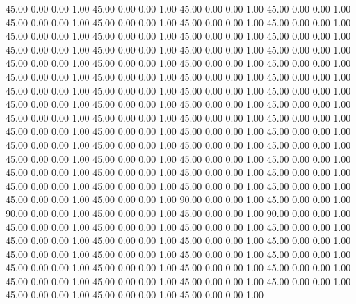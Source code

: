    45.00   0.00   0.00   1.00
   45.00   0.00   0.00   1.00
   45.00   0.00   0.00   1.00
   45.00   0.00   0.00   1.00
   45.00   0.00   0.00   1.00
   45.00   0.00   0.00   1.00
   45.00   0.00   0.00   1.00
   45.00   0.00   0.00   1.00
   45.00   0.00   0.00   1.00
   45.00   0.00   0.00   1.00
   45.00   0.00   0.00   1.00
   45.00   0.00   0.00   1.00
   45.00   0.00   0.00   1.00
   45.00   0.00   0.00   1.00
   45.00   0.00   0.00   1.00
   45.00   0.00   0.00   1.00
   45.00   0.00   0.00   1.00
   45.00   0.00   0.00   1.00
   45.00   0.00   0.00   1.00
   45.00   0.00   0.00   1.00
   45.00   0.00   0.00   1.00
   45.00   0.00   0.00   1.00
   45.00   0.00   0.00   1.00
   45.00   0.00   0.00   1.00
   45.00   0.00   0.00   1.00
   45.00   0.00   0.00   1.00
   45.00   0.00   0.00   1.00
   45.00   0.00   0.00   1.00
   45.00   0.00   0.00   1.00
   45.00   0.00   0.00   1.00
   45.00   0.00   0.00   1.00
   45.00   0.00   0.00   1.00
   45.00   0.00   0.00   1.00
   45.00   0.00   0.00   1.00
   45.00   0.00   0.00   1.00
   45.00   0.00   0.00   1.00
   45.00   0.00   0.00   1.00
   45.00   0.00   0.00   1.00
   45.00   0.00   0.00   1.00
   45.00   0.00   0.00   1.00
   45.00   0.00   0.00   1.00
   45.00   0.00   0.00   1.00
   45.00   0.00   0.00   1.00
   45.00   0.00   0.00   1.00
   45.00   0.00   0.00   1.00
   45.00   0.00   0.00   1.00
   45.00   0.00   0.00   1.00
   45.00   0.00   0.00   1.00
   45.00   0.00   0.00   1.00
   45.00   0.00   0.00   1.00
   45.00   0.00   0.00   1.00
   45.00   0.00   0.00   1.00
   45.00   0.00   0.00   1.00
   45.00   0.00   0.00   1.00
   45.00   0.00   0.00   1.00
   45.00   0.00   0.00   1.00
   45.00   0.00   0.00   1.00
   45.00   0.00   0.00   1.00
   90.00   0.00   0.00   1.00
   45.00   0.00   0.00   1.00
   90.00   0.00   0.00   1.00
   45.00   0.00   0.00   1.00
   45.00   0.00   0.00   1.00
   90.00   0.00   0.00   1.00
   45.00   0.00   0.00   1.00
   45.00   0.00   0.00   1.00
   45.00   0.00   0.00   1.00
   45.00   0.00   0.00   1.00
   45.00   0.00   0.00   1.00
   45.00   0.00   0.00   1.00
   45.00   0.00   0.00   1.00
   45.00   0.00   0.00   1.00
   45.00   0.00   0.00   1.00
   45.00   0.00   0.00   1.00
   45.00   0.00   0.00   1.00
   45.00   0.00   0.00   1.00
   45.00   0.00   0.00   1.00
   45.00   0.00   0.00   1.00
   45.00   0.00   0.00   1.00
   45.00   0.00   0.00   1.00
   45.00   0.00   0.00   1.00
   45.00   0.00   0.00   1.00
   45.00   0.00   0.00   1.00
   45.00   0.00   0.00   1.00
   45.00   0.00   0.00   1.00
   45.00   0.00   0.00   1.00
   45.00   0.00   0.00   1.00

